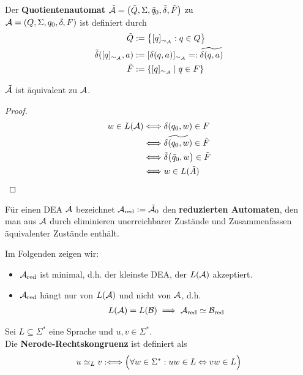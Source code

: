 \begin{definition}\label{def2.10}
	Der \textbf{Quotientenautomat} $\tilde{\mathcal{A}}=\big(\tilde{Q},\Sigma,\tilde{q}_0,\tilde{\delta},\tilde{F}\big)$ zu\\ $\mathcal{A}=(Q,\Sigma,q_0,\delta,F)$ ist definiert durch
	\begin{align*}
		\tilde{Q}&:=\big\lbrace[q]_{\sim_{\mathcal{A}}}:q\in Q\big\rbrace\\
		\tilde{\delta}([q]_{\sim_{\mathcal{A}}},a)&:=[\delta(q,a)]_{\sim_{\mathcal{A}}}=:\widetilde{\delta(q,a)}\\
		\tilde{F}&:=\lbrace[q]_{\sim_{\mathcal{A}}}\mid q\in F\rbrace
	\end{align*}
\end{definition}

\begin{lemma}\label{lemma2.11}
	$\tilde{\mathcal{A}}$ ist äquivalent zu $\mathcal{A}$.
\end{lemma}

\begin{proof}
	\begin{align*}
		w\in L(\mathcal{A})
		&\Longleftrightarrow \delta(q_0,w)\in F\\
		&\Longleftrightarrow\widetilde{\delta(q_0,w)}\in\tilde{F}\\
		&\Longleftrightarrow\tilde{\delta}\big(\tilde{q}_0,w\big)\in\tilde{F}\\
		&\Longleftrightarrow w\in L(\tilde{A})
	\end{align*}
\end{proof}

\begin{definition}\label{def2.12}
	Für einen DEA $\mathcal{A}$ bezeichnet $\mathcal{A}_{\text{red}}:=\tilde{\mathcal{A}}_0$ den \textbf{reduzierten Automaten}, den man aus $\mathcal{A}$ durch eliminieren unerreichbarer Zustände und Zusammenfassen äquivalenter Zustände enthält.
\end{definition}

Im Folgenden zeigen wir:
\begin{itemize}
	\item $\mathcal{A}_{\text{red}}$ ist minimal, d.h. der kleinste DEA, der $L(\mathcal{A})$ akzeptiert.
	\item $\mathcal{A}_{\text{red}}$ hängt nur von $L(\mathcal{A})$ und nicht von $\mathcal{A}$, d.h.
	\begin{align*}
		L(\mathcal{A})=L(\mathcal{B})\implies\mathcal{A}_{\text{red}}\simeq\mathcal{B}_{\text{red}}
	\end{align*}
\end{itemize}

\begin{definition}\label{def2.13}
	Sei $L\subseteq\Sigma^\ast$ eine Sprache und $u,v\in\Sigma^\ast$.\\
	Die \textbf{Nerode-Rechtskongruenz} ist definiert als
	\begin{align*}
		u \simeq_L v:\Longleftrightarrow\Big(\forall w\in\Sigma^\ast:uw\in L\Leftrightarrow vw\in L\Big)
	\end{align*}
\end{definition}

